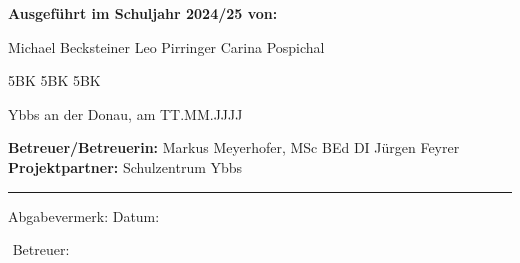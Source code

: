 \begin{titlepage}
\begin{minipage}[t]{0.92\textwidth}
	\begingroup
	\parfillskip=0pt
	\begin{minipage}[t]{0.60\textwidth}   %
		\textbf{Ausgeführt im Schuljahr 2024/25 von:} 
		\begin{minipage}[t]{0.50\textwidth}
			Michael Becksteiner \newline
			Leo Pirringer \newline
			Carina Pospichal \newline
		\end{minipage}
		\begin{minipage}[t]{0.11\textwidth}
			5BK \newline
			5BK \newline
			5BK \newline
		\end{minipage}
		\newline \newline
		Ybbs an der Donau, am TT.MM.JJJJ %
	\end{minipage}
	\hfill\vline\hfill
	\begin{minipage}[t]{0.36\textwidth}
		\textbf{Betreuer/Betreuerin:} 
		\newline
		Markus Meyerhofer, MSc BEd \newline
		DI Jürgen Feyrer \newline
		\newline
		\textbf{Projektpartner:} Schulzentrum Ybbs
	\end{minipage}
	\par\endgroup
	\vspace{1cm}
\end{minipage}

\hrule
\vspace{7mm}

\begin{minipage}[t]{0.92\textwidth}
	\begingroup
	\parfillskip=0pt
	\begin{minipage}[t]{0.46\textwidth}
		Abgabevermerk:
		\newline
		\newline
		Datum:
	\end{minipage}%
	\hfill
	\begin{minipage}[t]{0.46\textwidth}
		$ $
		\newline
		\newline
		Betreuer:
	\end{minipage}%
	\par\endgroup
\end{minipage}


\end{titlepage}